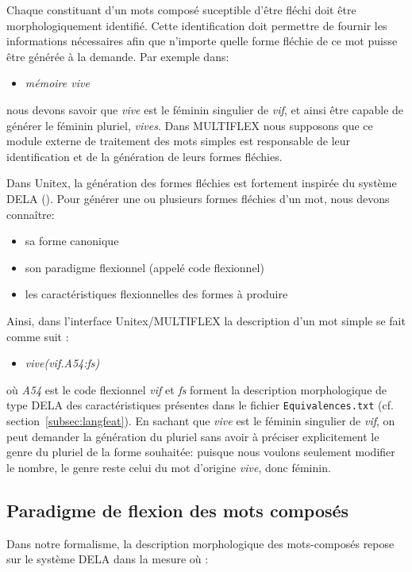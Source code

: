 \bigskip
\noindent Chaque constituant d'un mots composé suceptible d'être fléchi doit être morphologiquement 
identifié. Cette identification doit permettre de fournir les informations nécessaires afin que
n'importe quelle forme fléchie de ce mot puisse être générée à la demande. Par exemple dans:
\begin{itemize}
\item \emph{mémoire vive}
\end{itemize} 
nous devons savoir que \emph{vive} est le féminin singulier de \emph{vif}, et ainsi être capable de
générer le féminin pluriel, \emph{vives}. Dans MULTIFLEX nous supposons que ce module externe de
traitement des mots simples est responsable de leur identification et de la génération de leurs
formes fléchies.

\bigskip
\noindent Dans Unitex, la génération des formes fléchies est fortement inspirée du système DELA
(\cite{dicos-francais}). Pour générer une ou plusieurs formes fléchies d'un mot, nous devons
connaître:

\begin{itemize}
\item sa forme canonique
\item son paradigme flexionnel (appelé code flexionnel)
\item les caractéristiques flexionnelles des formes à produire
\end{itemize}

\bigskip
\noindent Ainsi, dans l'interface Unitex/MULTIFLEX la description d'un mot simple se fait comme suit
:

\begin{itemize}
\item \emph{vive(vif.A54:fs)}
\end{itemize} 

\bigskip
\noindent où \emph{A54} est le code flexionnel \emph{vif} et \emph{fs} forment la description
morphologique de type DELA des caractéristiques présentes dans le fichier \verb+Equivalences.txt+
(cf. section~\ref{subsec:langfeat}). En sachant que \emph{vive} est le féminin singulier de
\emph{vif}, on peut demander la génération du pluriel sans avoir à préciser explicitement le genre
du pluriel de la forme souhaitée: puisque nous voulons seulement modifier le nombre, le genre reste
celui du mot d'origine \emph{vive}, donc féminin.

\subsection{Paradigme de flexion des mots composés}
\label{subsec:paradigm}
Dans notre formalisme, la description morphologique des mots-composés repose sur le système DELA dans
la mesure où :

